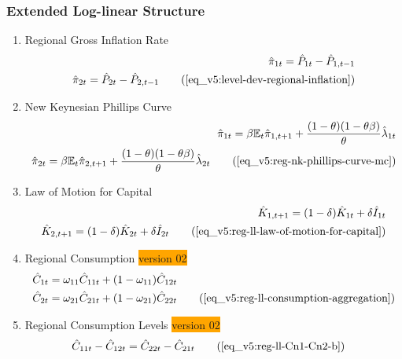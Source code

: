 \documentclass[../thesis.tex]{subfiles}
\begin{document}
{\singlespacing
	
	\subsubsection{Extended Log-linear Structure}
	
	\begin{enumerate}
		
		\item Regional Gross Inflation Rate
		\begin{align}
			\hat{\pi}_{1 t} = \hat{P}_{1 t} - \hat{P}_{1, t-1} \nonumber \\
			\hat{\pi}_{2 t} = \hat{P}_{2 t} - \hat{P}_{2, t-1} \tag{\ref{eq_v5:level-dev-regional-inflation}}
		\end{align}
		
		\item New Keynesian Phillips Curve
		\begin{align}
			\hat{\pi}_{1 t} = \beta \E \hat{\pi}_{1, t+1} + \frac{(1-\theta) (1- \theta \beta)}{\theta} \hat{\lambda}_{1 t} \nonumber \\
			\hat{\pi}_{2 t} = \beta \E \hat{\pi}_{2, t+1} + \frac{(1-\theta) (1- \theta \beta)}{\theta} \hat{\lambda}_{2 t} \tag{\ref{eq_v5:reg-nk-phillips-curve-mc}}
		\end{align}
		
		\item Law of Motion for Capital
		\begin{alignat}{2}
			\hat{K}_{1, t+1} = (1-\delta) \hat{K}_{1 t} + \delta \hat{I}_{1 t} \nonumber \\
			\hat{K}_{2, t+1} = (1-\delta) \hat{K}_{2 t} + \delta \hat{I}_{2 t} \tag{\ref{eq_v5:reg-ll-law-of-motion-for-capital}} 
		\end{alignat}


		\item Regional Consumption \colorbox{orange}{version 02}
		\begin{align}
			\hat{C}_{1t} &= \omega_{11} \hat{C}_{11t} + (1-\omega_{11}) \hat{C}_{12t} \nonumber \\ 
			\hat{C}_{2t} &= \omega_{21} \hat{C}_{21t} + (1-\omega_{21}) \hat{C}_{22t} \tag{\ref{eq_v5:reg-ll-consumption-aggregation}}
		\end{align}
		
		\item Regional Consumption Levels \colorbox{orange}{version 02}
		\begin{align}
			\hat{C}_{11t} - \hat{C}_{12t} &= \hat{C}_{22t} - \hat{C}_{21t} \tag{\ref{eq_v5:reg-ll-Cn1-Cn2-b}}
		\end{align}


\end{enumerate}}
\end{document}
